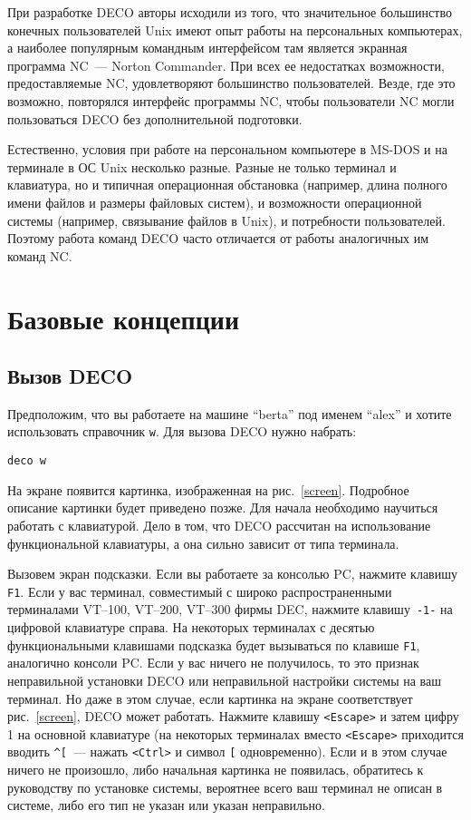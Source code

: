 При разработке DECO авторы исходили из того, что значительное большинство
конечных пользователей Unix имеют опыт работы на персональных компьютерах,
а наиболее популярным командным интерфейсом там является
экранная программа NC~--- Norton Commander. При всех ее недостатках
возможности, предоставляемые NC, удовлетворяют большинство пользователей.
Везде, где это возможно, повторялся интерфейс программы NC, чтобы
пользователи NC могли пользоваться DECO без дополнительной подготовки.

Естественно, условия при работе на персональном компьютере в MS-DOS
и на терминале в ОС Unix несколько разные. Разные не только терминал и
клавиатура, но и типичная операционная обстановка (например,
длина полного имени файлов и размеры файловых систем), и
возможности операционной системы (например, связывание файлов в Unix),
и потребности пользователей. Поэтому работа команд DECO часто отличается
от работы аналогичных им команд NC.

\section{Базовые концепции}

\subsection{Вызов DECO}

Предположим, что вы работаете на машине ``berta'' под именем ``alex'' и
хотите использовать справочник {\tt w}.
Для вызова DECO нужно набрать:

\begin{source}
\begin{verbatim}
deco w
\end{verbatim}
\end{source}

На экране появится картинка, изображенная на рис.~\ref{screen}.
Подробное описание картинки будет приведено позже.
Для начала необходимо научиться работать с клавиатурой. Дело в том, что DECO
рассчитан на использование функциональной клавиатуры, а она сильно
зависит от типа терминала.

Вызовем экран подсказки. Если вы работаете за консолью PC, нажмите клавишу
{\tt F1}. Если у вас терминал, совместимый с широко распространенными
терминалами VT--100, VT--200, VT--300 фирмы DEC, нажмите клавишу~{\tt -1-}
на цифровой клавиатуре справа. На некоторых терминалах с десятью
функциональными клавишами подсказка будет вызываться по клавише {\tt F1},
аналогично консоли PC. Если у вас ничего не получилось, то это признак
неправильной установки DECO или неправильной настройки системы на ваш терминал.
Но даже в этом случае, если картинка на экране соответствует рис.~\ref{screen},
DECO может работать. Нажмите клавишу {\tt <Escape>} и затем
цифру 1 на основной клавиатуре (на некоторых терминалах вместо {\tt <Escape>}
приходится вводить {\tt \^{}[}~--- нажать {\tt <Ctrl>} и символ {\tt [}
одновременно). Если и в этом случае ничего не
произошло, либо начальная картинка не появилась, обратитесь к
руководству по установке системы, вероятнее всего ваш терминал не описан в
системе, либо его тип не указан или указан неправильно.

